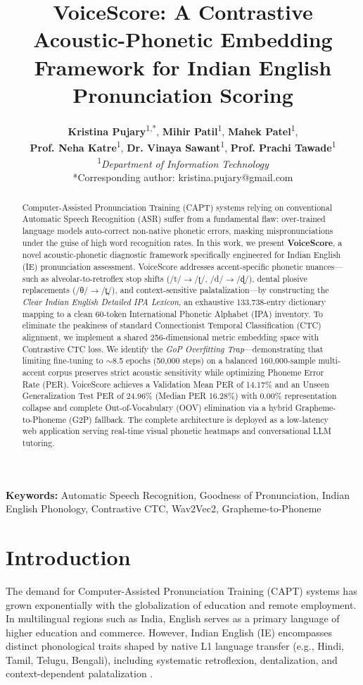 \documentclass[11pt,a4paper]{article}
\title{\Large \textbf{VoiceScore: A Contrastive Acoustic-Phonetic Embedding Framework for Indian English Pronunciation Scoring}}
\author{
    \textbf{Kristina Pujary}\textsuperscript{1,*}, 
    \textbf{Mihir Patil}\textsuperscript{1}, 
    \textbf{Mahek Patel}\textsuperscript{1}, \\
    \textbf{Prof. Neha Katre}\textsuperscript{1}, 
    \textbf{Dr. Vinaya Sawant}\textsuperscript{1}, 
    \textbf{Prof. Prachi Tawade}\textsuperscript{1} \\[0.5em]
    \textsuperscript{1}\textit{Department of Information Technology} \\
    \small{*Corresponding author: kristina.pujary@gmail.com}
}
\date{}
\begin{document}
\maketitle

\begin{abstract}
Computer-Assisted Pronunciation Training (CAPT) systems relying on conventional Automatic Speech Recognition (ASR) suffer from a fundamental flaw: over-trained language models auto-correct non-native phonetic errors, masking mispronunciations under the guise of high word recognition rates. In this work, we present \textbf{VoiceScore}, a novel acoustic-phonetic diagnostic framework specifically engineered for Indian English (IE) pronunciation assessment. VoiceScore addresses accent-specific phonetic nuances—such as alveolar-to-retroflex stop shifts (/t/$\rightarrow$/ʈ/, /d/$\rightarrow$/ɖ/), dental plosive replacements (/θ/$\rightarrow$/t̪/), and context-sensitive palatalization—by constructing the \textit{Clear Indian English Detailed IPA Lexicon}, an exhaustive 133,738-entry dictionary mapping to a clean 60-token International Phonetic Alphabet (IPA) inventory. To eliminate the peakiness of standard Connectionist Temporal Classification (CTC) alignment, we implement a shared 256-dimensional metric embedding space with Contrastive CTC loss. We identify the \textit{GoP Overfitting Trap}—demonstrating that limiting fine-tuning to $\sim$8.5 epochs (50,000 steps) on a balanced 160,000-sample multi-accent corpus preserves strict acoustic sensitivity while optimizing Phoneme Error Rate (PER). VoiceScore achieves a Validation Mean PER of 14.17\% and an Unseen Generalization Test PER of 24.96\% (Median PER 16.28\%) with 0.00\% representation collapse and complete Out-of-Vocabulary (OOV) elimination via a hybrid Grapheme-to-Phoneme (G2P) fallback. The complete architecture is deployed as a low-latency web application serving real-time visual phonetic heatmaps and conversational LLM tutoring.
\end{abstract}

\textbf{Keywords:} Automatic Speech Recognition, Goodness of Pronunciation, Indian English Phonology, Contrastive CTC, Wav2Vec2, Grapheme-to-Phoneme

\section{Introduction}\label{sec1}
The demand for Computer-Assisted Pronunciation Training (CAPT) systems has grown exponentially with the globalization of education and remote employment. In multilingual regions such as India, English serves as a primary language of higher education and commerce. However, Indian English (IE) encompasses distinct phonological traits shaped by native L1 language transfer (e.g., Hindi, Tamil, Telugu, Bengali), including systematic retroflexion, dentalization, and context-dependent palatalization \cite{pandey2021indian}.
\end{document}
